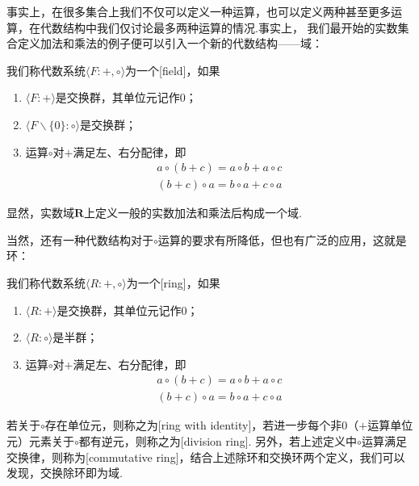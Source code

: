 事实上，在很多集合上我们不仅可以定义一种运算，也可以定义两种甚至更多运算，在代数结构中我们仅讨论最多两种运算的情况.事实上，
我们最开始的实数集合定义加法和乘法的例子便可以引入一个新的代数结构——域：
\begin{definition}
    我们称代数系统$\langle F:+,\circ\rangle$为一个[field]，如果
    \begin{enumerate}
        \item $\langle F:+\rangle$是交换群，其单位元记作0；

        \item $\langle F\backslash\{0\}:\circ\rangle$是交换群；

        \item 运算$\circ$对$+$满足左、右分配律，即
        \begin{gather*}
            a\circ(b+c)=a\circ b+a\circ c \\
            (b+c)\circ a=b\circ a+c\circ a
        \end{gather*}
    \end{enumerate}
\end{definition}

显然，实数域$\mathbf{R}$上定义一般的实数加法和乘法后构成一个域.

当然，还有一种代数结构对于$\circ$运算的要求有所降低，但也有广泛的应用，这就是环：
\begin{definition}
    我们称代数系统$\langle R:+,\circ\rangle$为一个[ring]，如果
    \begin{enumerate}
        \item $\langle R:+\rangle$是交换群，其单位元记作0；

        \item $\langle R:\circ\rangle$是半群；

        \item 运算$\circ$对$+$满足左、右分配律，即
        \begin{gather*}
            a\circ(b+c)=a\circ b+a\circ c \\
            (b+c)\circ a=b\circ a+c\circ a
        \end{gather*}
    \end{enumerate}

    若关于$\circ$存在单位元，则称之为[ring with identity]，若进一步每个非0（$+$运算单位元）元素关于$\circ$都有逆元，则称之为[division ring].
    另外，若上述定义中$\circ$运算满足交换律，则称为[commutative ring]，结合上述除环和交换环两个定义，我们可以发现，交换除环即为域.
\end{definition}

